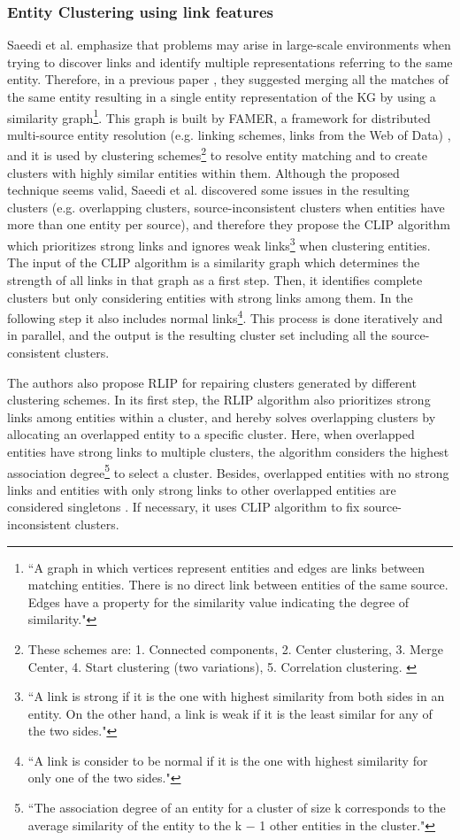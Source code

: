 \documentclass[runningheads]{llncs}
\begin{document}
\subsubsection{Entity Clustering using link features} \label{entity-clustering} 
Saeedi et al. \cite{Saeedi} emphasize that problems may arise in large-scale environments when trying to discover links and identify multiple representations referring to the same entity. Therefore, in a previous paper \cite{Peukert}, they suggested merging all the matches of the same entity resulting in a single entity representation of the KG by using a similarity graph\footnote{``A graph in which vertices represent entities and edges are links between matching entities. There is no direct link between entities of the same source. Edges have a property for the similarity value indicating the degree of similarity."\cite{Saeedi}}. This graph is built by FAMER, a framework for distributed multi-source entity resolution (e.g. linking schemes, links from the Web of Data) \cite{Peukert}, and it is used by clustering schemes\footnote{These schemes are: 1. Connected components, 2. Center clustering, 3. Merge Center, 4. Start clustering (two variations), 5. Correlation clustering. \cite{Peukert}} to resolve entity matching and to create clusters with highly similar entities within them. Although the proposed technique seems valid, Saeedi et al. discovered some issues in the resulting clusters (e.g. overlapping clusters, source-inconsistent clusters when entities have more than one entity per source), and therefore they propose the CLIP algorithm which prioritizes strong links and ignores weak links\footnote{``A link is strong if it is the one with highest similarity from both sides in an entity. On the other hand, a link is weak if it is the least similar for any of the two sides."\cite{Saeedi}} when clustering entities. The input of the CLIP algorithm is a similarity graph which determines the strength of all links in that graph as a first step. Then, it identifies complete clusters but only considering entities with strong links among them. In the following step it also includes normal links\footnote{``A link is consider to be normal if it is the one with highest similarity for only one of the two sides."\cite{Saeedi}}. This process is done iteratively and in parallel, and the output is the resulting cluster set including all the source-consistent clusters. 

The authors also propose RLIP for repairing clusters generated by different clustering schemes. In its first step, the RLIP algorithm also prioritizes strong links among entities within a cluster, and hereby solves overlapping clusters by allocating an overlapped entity to a specific cluster. Here, when overlapped entities have strong links to multiple clusters, the algorithm considers the highest association degree\footnote{``The association degree of an entity for a cluster of size k corresponds to the average similarity of the entity to the k − 1 other entities in the cluster."\cite{Saeedi}} to select a cluster. Besides, overlapped entities with no strong links and entities with only strong links to other overlapped entities are considered singletons \cite{Saeedi}. If necessary, it uses CLIP algorithm to fix source-inconsistent clusters.
\end{document}
